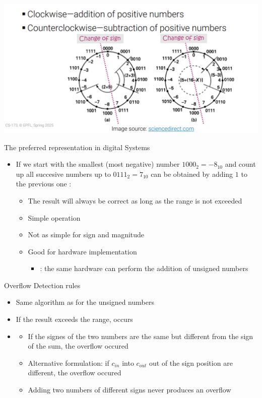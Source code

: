 \begin{center}
\includegraphics[scale=0.4]{Capture d’écran (114).png}
\end{center}

\begin{parag}{The preferred representation in digital Systems}
    \begin{itemize}
        \item If we start with the smallest (most negative) number $1000_2 = -8_{10}$ and count up all succesive numbers up to $0111_2 = 7_{10}$ can be obtained by adding $1$ to the previous one :
        \begin{itemize}
            \item The result will always be correct as long as the range is not exceeded
            \item Simple operation
            \item Not as simple for sign and magnitude
            \item Good for hardware implementation
            \begin{itemize}
                \item {}: the same hardware can perform the addition of unsigned numbers
            \end{itemize}
        \end{itemize}
    \end{itemize}
\end{parag}
\begin{parag}{Overflow Detection rules}
    \begin{itemize}
        \item Same algorithm as for the unsigned numbers
        \item If the result exceeds the range,  occurs
        \item {}
        \begin{itemize}
            \item If the signes of the two numbers are the same but different from the sign of the sum, the overflow occured
            \item Alternative formulation: if $c_{in}$ into  $c_{out}$ out of the sign position are different, the overflow occured
            \item Adding two numbers of different signs never produces an overflow
        \end{itemize}
    \end{itemize}
\end{parag}

